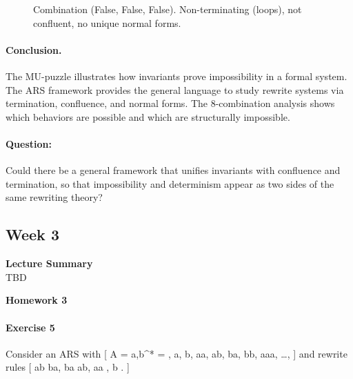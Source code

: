 \documentclass{article}
\theoremstyle{theorem}
\theoremstyle{definition}
\theoremstyle{remark}
\begin{document}
\begin{figure}[H]
\centering
{}
\caption{Combination (False, False, False). Non-terminating (loops), not confluent, no unique normal forms.}
\label{fig:combo-fff}
\end{figure}

\FloatBarrier

\noindent\paragraph{Conclusion.}
The MU-puzzle illustrates how invariants prove impossibility in a formal system.
The ARS framework provides the general language to study rewrite systems via termination, confluence, and normal forms.
The 8-combination analysis shows which behaviors are possible and which are structurally impossible.

\noindent\paragraph{Question:}
Could there be a general framework that unifies invariants with confluence and termination, so that impossibility and determinism appear as two sides of the same rewriting theory?

\subsection{Week 3}
\textbf{Lecture Summary}
\\TBD

\textbf{Homework 3}
\paragraph{Exercise 5}

Consider an ARS with
[
A = {a,b}^* = {\varepsilon, a, b, aa, ab, ba, bb, aaa, \dots },
]
and rewrite rules
[
ab \to ba, \qquad 
ba \to ab, \qquad 
aa \to \varepsilon, \qquad 
b \to \varepsilon.
]
\end{document}

